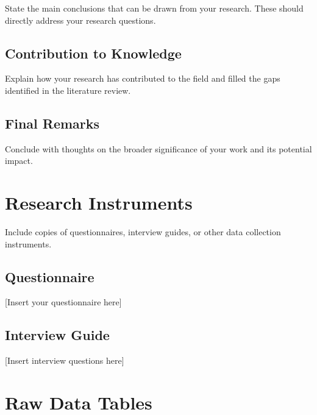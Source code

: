 \documentclass[12pt, a4paper]{report}
\begin{document}
	State the main conclusions that can be drawn from your research. These should directly address your research questions.
	
	\section{Contribution to Knowledge}
	
	Explain how your research has contributed to the field and filled the gaps identified in the literature review.
	
	\section{Final Remarks}
	
	Conclude with thoughts on the broader significance of your work and its potential impact.
	
	
	
	
	\appendix
	
	\chapter{Research Instruments}
	\label{app:instruments}
	
	Include copies of questionnaires, interview guides, or other data collection instruments.
	
	\section{Questionnaire}
	
	[Insert your questionnaire here]
	
	\section{Interview Guide}
	
	[Insert interview questions here]
	
	\chapter{Raw Data Tables}
	\label{app:data}
	
\end{document}
